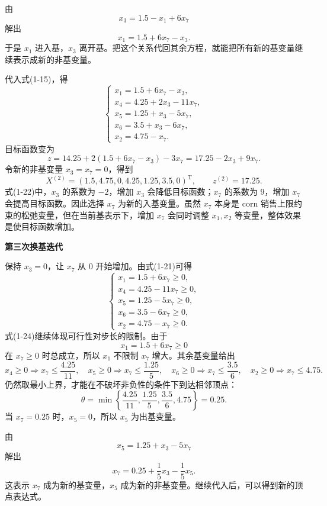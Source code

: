 ﻿\documentclass[UTF8,zihao=-4,fontset=none]{ctexart}
\newcommand{\stepheading}[1]{\vspace{0.6em}\noindent\textbf{#1}\par}
\begin{document}
由
\[
    x_3=1.5-x_1+6x_7
\]
解出
\[
    x_1=1.5+6x_7-x_3. \tag{1-20}
\]
于是 \(x_1\) 进入基，\(x_3\) 离开基。把这个关系代回其余方程，就能把所有新的基变量继续表示成新的非基变量。

代入式(1-15)，得
\[
    \begin{cases}
    x_1=1.5+6x_7-x_3,\\
    x_4=4.25+2x_3-11x_7,\\
    x_5=1.25+x_3-5x_7,\\
    x_6=3.5+x_3-6x_7,\\
    x_2=4.75-x_7.
    \end{cases} \tag{1-21}
\]
目标函数变为
\[
    z=14.25+2(1.5+6x_7-x_3)-3x_7=17.25-2x_3+9x_7. \tag{1-22}
\]
令新的非基变量 \(x_3=x_7=0\)，得到
\[
    X^{(2)}=(1.5,4.75,0,4.25,1.25,3.5,0)^{\mathrm T},\qquad z^{(2)}=17.25. \tag{1-23}
\]
式(1-22)中，\(x_3\) 的系数为 \(-2\)，增加 \(x_3\) 会降低目标函数；\(x_7\) 的系数为 \(9\)，增加 \(x_7\) 会提高目标函数。因此选择 \(x_7\) 为新的入基变量。虽然 \(x_7\) 本身是 corn 销售上限约束的松弛变量，但在当前基表示下，增加 \(x_7\) 会同时调整 \(x_1,x_2\) 等变量，整体效果是使目标函数增加。

\stepheading{第三次换基迭代}

保持 \(x_3=0\)，让 \(x_7\) 从 \(0\) 开始增加。由式(1-21)可得
\[
    \begin{cases}
    x_1=1.5+6x_7\ge 0,\\
    x_4=4.25-11x_7\ge 0,\\
    x_5=1.25-5x_7\ge 0,\\
    x_6=3.5-6x_7\ge 0,\\
    x_2=4.75-x_7\ge 0.
    \end{cases} \tag{1-24}
\]
式(1-24)继续体现可行性对步长的限制。由于
\[
    x_1=1.5+6x_7\ge0
\]
在 \(x_7\ge0\) 时总成立，所以 \(x_1\) 不限制 \(x_7\) 增大。其余基变量给出
\[
    x_4\ge0\Rightarrow x_7\le\frac{4.25}{11},\quad
    x_5\ge0\Rightarrow x_7\le\frac{1.25}{5},\quad
    x_6\ge0\Rightarrow x_7\le\frac{3.5}{6},\quad
    x_2\ge0\Rightarrow x_7\le4.75.
\]
仍然取最小上界，才能在不破坏非负性的条件下到达相邻顶点：
\[
    \theta=\min\left\{\frac{4.25}{11},\frac{1.25}{5},\frac{3.5}{6},4.75\right\}=0.25. \tag{1-25}
\]
当 \(x_7=0.25\) 时，\(x_5=0\)，所以 \(x_5\) 为出基变量。

由
\[
    x_5=1.25+x_3-5x_7
\]
解出
\[
    x_7=0.25+\frac{1}{5}x_3-\frac{1}{5}x_5. \tag{1-26}
\]
这表示 \(x_7\) 成为新的基变量，\(x_5\) 成为新的非基变量。继续代入后，可以得到新的顶点表达式。
\end{document}
